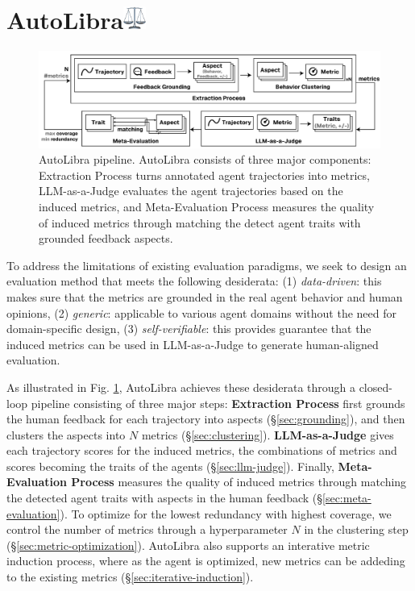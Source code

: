 \section{AutoLibra\protect\includegraphics[height=1em]{figs/scale.png}}

\begin{figure}[!t]
    \centering
    \includegraphics[width=\textwidth]{figs/autolibra-pipeline.pdf}
    \caption{AutoLibra pipeline. AutoLibra consists of three major components: Extraction Process
    turns annotated agent trajectories into metrics, LLM-as-a-Judge evaluates the agent trajectories
    based on the induced metrics, and Meta-Evaluation Process measures the quality of induced metrics
    through matching the detect agent traits with grounded feedback aspects.
    }
    \label{fig:autolibra-pipeline}
\end{figure}

To address the limitations of existing evaluation paradigms, we seek to design an evaluation method that 
meets the following desiderata: (1) \emph{data-driven}: this makes sure that the metrics are grounded
in the real agent behavior and human opinions, (2) \emph{generic}: applicable to various agent domains 
without the need for domain-specific design, (3) \emph{self-verifiable}: this provides guarantee that the 
induced metrics can be used in LLM-as-a-Judge to generate human-aligned evaluation. 

As illustrated in Fig. \ref{fig:autolibra-pipeline}, AutoLibra achieves these desiderata through a closed-loop pipeline
consisting of three major steps: \textbf{Extraction Process} first grounds the human feedback
for each trajectory into aspects (\S\ref{sec:grounding}), and then clusters the aspects into $N$ metrics (\S\ref{sec:clustering}).
\textbf{LLM-as-a-Judge} gives each trajectory scores for the induced metrics, the combinations of
metrics and scores becoming the traits of the agents (\S\ref{sec:llm-judge}).
Finally, \textbf{Meta-Evaluation Process} measures the quality of induced metrics through matching
the detected agent traits with aspects in the human feedback (\S\ref{sec:meta-evaluation}).
To optimize for the lowest redundancy with highest coverage, we control the number of metrics 
through a hyperparameter $N$ in the clustering step (\S\ref{sec:metric-optimization}). AutoLibra also supports
an interative metric induction process, where as the agent is optimized, new metrics can be addeding 
to the existing metrics (\S\ref{sec:iterative-induction}).

